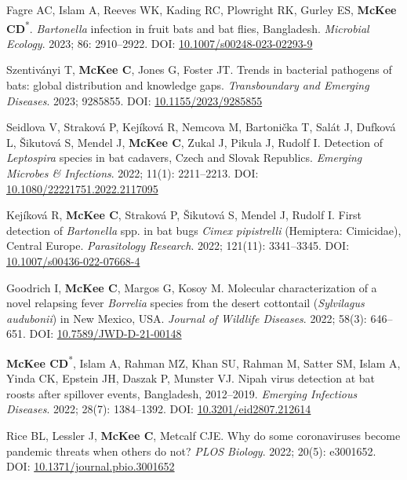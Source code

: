 \documentclass{cv}
\begin{document}
\begin{pubenum}
\item Fagre AC, Islam A, Reeves WK, Kading RC, Plowright RK, Gurley ES, \textbf{McKee CD}\textsuperscript{*}. \textit{Bartonella} infection in fruit bats and bat flies, Bangladesh. \textit{Microbial Ecology}. 2023; 86: 2910–2922. DOI: \href{https://doi.org/10.1007/s00248-023-02293-9}{10.1007/s00248-023-02293-9}

\item Szentiványi T, \textbf{McKee C}, Jones G, Foster JT. Trends in bacterial pathogens of bats: global distribution and knowledge gaps. \textit{Transboundary and Emerging Diseases}. 2023; 9285855. DOI: \href{https://doi.org/10.1155/2023/9285855}{10.1155/2023/9285855}

\item Seidlova V, Straková P, Kejíková R, Nemcova M, Bartonička T, Salát J, Dufková L, Šikutová S, Mendel J, \textbf{McKee C}, Zukal J, Pikula J, Rudolf I. Detection of \textit{Leptospira} species in bat cadavers, Czech and Slovak Republics. \textit{Emerging Microbes \& Infections}. 2022; 11(1): 2211--2213. DOI: \href{https://doi.org/10.1080/22221751.2022.2117095}{10.1080/22221751.2022.2117095}

\item Kejíková R, \textbf{McKee C}, Straková P, Šikutová S, Mendel J, Rudolf I. First detection of \textit{Bartonella} spp. in bat bugs \textit{Cimex pipistrelli} (Hemiptera: Cimicidae), Central Europe. \textit{Parasitology Research}. 2022; 121(11): 3341--3345. DOI: \href{https://doi.org/10.1007/s00436-022-07668-4}{10.1007/s00436-022-07668-4}

\item Goodrich I, \textbf{McKee C}, Margos G, Kosoy M. Molecular characterization of a novel relapsing fever \textit{Borrelia} species from the desert cottontail (\textit{Sylvilagus audubonii}) in New Mexico, USA. \textit{Journal of Wildlife Diseases}. 2022; 58(3): 646--651. DOI: \href{https://doi.org/10.7589/JWD-D-21-00148}{10.7589/JWD-D-21-00148}

\item \textbf{McKee CD}\textsuperscript{*\dag}, Islam A\textsuperscript{\dag}, Rahman MZ, Khan SU, Rahman M, Satter SM, Islam A, Yinda CK, Epstein JH, Daszak P, Munster VJ. Nipah virus detection at bat roosts after spillover events, Bangladesh, 2012–2019. \textit{Emerging Infectious Diseases}. 2022; 28(7): 1384--1392. DOI: \href{https://doi.org/10.3201/eid2807.212614}{10.3201/eid2807.212614}

\item Rice BL\textsuperscript{\dag}, Lessler J\textsuperscript{\dag}, \textbf{McKee C}\textsuperscript{\dag}, Metcalf CJE\textsuperscript{\dag}. Why do some coronaviruses become pandemic threats when others do not? \textit{PLOS Biology}. 2022; 20(5): e3001652. DOI: \href{https://doi.org/10.1371/journal.pbio.3001652}{10.1371/journal.pbio.3001652}


\end{pubenum}
\end{document}
